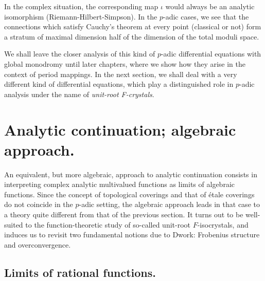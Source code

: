 \begin{para}
In the complex situation, the corresponding map $\iota$ would always be
an analytic isomorphism (Riemann-Hilbert-Simpson). In the $p$-adic
cases, we see that the connections which satisfy Cauchy's theorem at
every point (classical or not) form a stratum of maximal dimension half
of the dimension of the total moduli space.
\end{para}


\vspace{10pt}\par
We shall leave the closer analysis of this kind of $p$-adic 
differential equations with global monodromy until later chapters, where
we show how they arise in the context of period mappings. In the next 
section, we shall deal with a very different kind of differential 
equations, which play a distinguished role in $p$-adic analysis under 
the name of {\it unit-root F-crystals}.



\newpage
\section{Analytic continuation; algebraic approach.}

\begin{abst}
 An equivalent, but more algebraic, approach to analytic continuation
 consists in interpreting complex analytic multivalued functions as
 limits of algebraic functions.
 Since the concept of topological coverings and that of \'etale coverings
 do not coincide in the $p$-adic setting, the algebraic approach 
 leads in that case to a theory quite different 
 from that of the previous section.  It turns out to be well-suited to
 the function-theoretic study of so-called unit-root $F$-isocrystals, and induces
 us to revisit two fundamental notions due to Dwork: Frobenius structure 
 and overconvergence.
\end{abst}

%
%
\subsection{Limits of rational functions.}\label{subsec-limit-rational}

